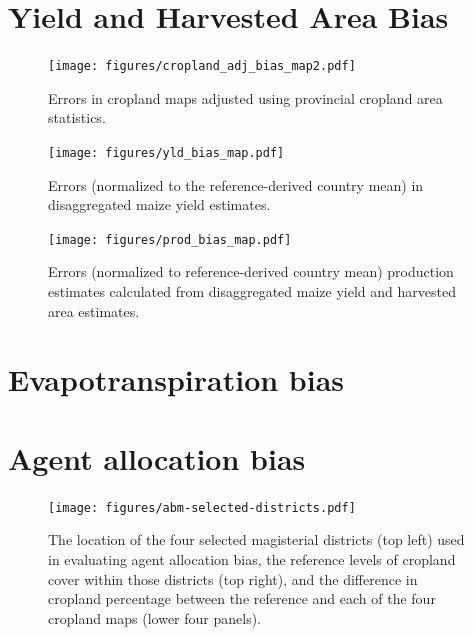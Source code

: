 \documentclass[11pt, titlepage]{article}
\begin{document}


\FloatBarrier



\section*{Yield and Harvested Area Bias}
\begin{figure}[ht]
  \centering
     \texttt{[image: figures/cropland\_adj\_bias\_map2.pdf]} 
      \caption{Errors in cropland maps adjusted using provincial cropland area statistics.}
      \label{fig:default}
\end{figure}

\FloatBarrier


\clearpage
\begin{figure}[ht]
  \centering
     \texttt{[image: figures/yld\_bias\_map.pdf]} 
      \caption{Errors (normalized to the reference-derived country mean) in disaggregated maize yield estimates.}
      \label{fig:default}
\end{figure}

\begin{figure}[ht]
  \centering
     \texttt{[image: figures/prod\_bias\_map.pdf]} 
      \caption{Errors (normalized to reference-derived country mean) production estimates calculated from disaggregated maize yield and harvested area estimates.}
      \label{fig:default}
\end{figure}

\FloatBarrier


\section*{Evapotranspiration bias}
%

\section*{Agent allocation bias}

\begin{figure}[ht]
  \centering
     \texttt{[image: figures/abm-selected-districts.pdf]} 
      \caption{The location of the four selected magisterial districts (top left) used in evaluating agent allocation bias, the reference levels of cropland cover within those districts (top right), and the difference in cropland percentage between the reference and each of the four cropland maps (lower four panels). }
      \label{fig:default}
\end{figure}



\FloatBarrier
 
{\footnotesize }
\end{document}
